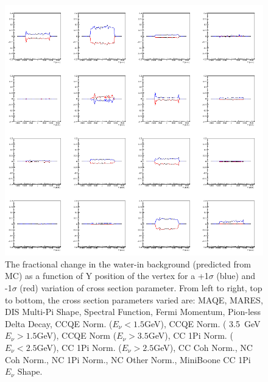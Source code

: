 \begin{figure}[H]
\centering
\includegraphics[width=5in]{Figures/TN100Plots/c_16_0.png}
\caption{The fractional change in the water-in background (predicted from MC) as a function of Y position of the vertex for a +1$\sigma$ (blue) and -1$\sigma$ (red) variation of cross section parameter. From left to right, top to bottom, the cross section parameters varied are: MAQE, MARES, DIS Multi-Pi Shape, Spectral Function, Fermi Momentum, Pion-less Delta Decay, CCQE Norm. ($E_\nu < 1.5$GeV), CCQE Norm. ( 3.5~GeV$E_\nu>1.5$GeV), CCQE Norm ($E_\nu > 3.5$GeV), CC 1Pi Norm. ($E_\nu < 2.5$GeV), CC 1Pi Norm. ($E_\nu > 2.5$GeV), CC Coh Norm., NC Coh Norm., NC 1Pi Norm., NC Other Norm., MiniBoone CC 1Pi $E_\nu$ Shape.}
\label{fig:xsvarYwB}
\end{figure}
